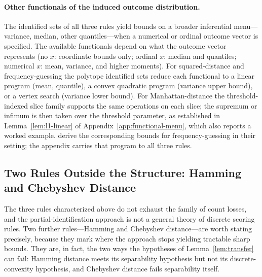 \paragraph{Other functionals of the induced outcome distribution.}
The identified sets of all three rules yield bounds on a broader inferential menu---variance, median, other quantiles---when a numerical or ordinal outcome vector is specified. The available functionals depend on what the outcome vector represents (no \(x\): coordinate bounds only; ordinal \(x\): median and quantiles; numerical \(x\): mean, variance, and higher moments). For squared-distance and frequency-guessing the polytope identified sets reduce each functional to a linear program (mean, quantile), a convex quadratic program (variance upper bound), or a vertex search (variance lower bound). For Manhattan-distance the threshold-indexed slice family supports the same operations on each slice; the supremum or infimum is then taken over the threshold parameter, as established in Lemma~\ref{lem:l1-linear} of Appendix~\ref{app:functional-menu}, which also reports a worked example. \citet{SchlagTremewan2021} derive the corresponding bounds for frequency-guessing in their setting; the appendix carries that program to all three rules.

\subsection{Two Rules Outside the Structure: Hamming and Chebyshev Distance}\label{sec:other-rules}

The three rules characterized above do not exhaust the family of count losses, and the partial-identification approach is not a general theory of discrete scoring rules.
Two further rules---Hamming and Chebyshev distance---are worth stating precisely, because they mark where the approach stops yielding tractable sharp bounds.
They are, in fact, the two ways the hypotheses of Lemma~\ref{lem:transfer} can fail: Hamming distance meets its separability hypothesis but not its discrete-convexity hypothesis, and Chebyshev distance fails separability itself.

